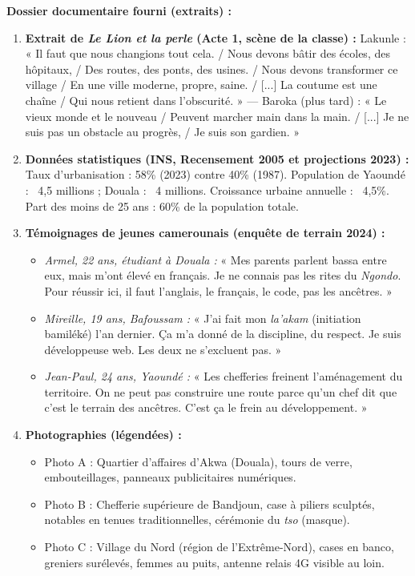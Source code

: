 \documentclass[11pt]{article}
\begin{document}
\medskip
\textbf{Dossier documentaire fourni (extraits) :}

\begin{enumerate}
    \item \textbf{Extrait de \emph{Le Lion et la perle} (Acte 1, scène de la classe) :} Lakunle : « Il faut que nous changions tout cela. / Nous devons bâtir des écoles, des hôpitaux, / Des routes, des ponts, des usines. / Nous devons transformer ce village / En une ville moderne, propre, saine. / [...] La coutume est une chaîne / Qui nous retient dans l'obscurité. » — Baroka (plus tard) : « Le vieux monde et le nouveau / Peuvent marcher main dans la main. / [...] Je ne suis pas un obstacle au progrès, / Je suis son gardien. »
    \item \textbf{Données statistiques (INS, Recensement 2005 et projections 2023) :} Taux d'urbanisation : 58\% (2023) contre 40\% (1987). Population de Yaoundé : ~4,5 millions ; Douala : ~4 millions. Croissance urbaine annuelle : ~4,5\%. Part des moins de 25 ans : 60\% de la population totale.
    \item \textbf{Témoignages de jeunes camerounais (enquête de terrain 2024) :}
    \begin{itemize}
        \item \textit{Armel, 22 ans, étudiant à Douala :} « Mes parents parlent bassa entre eux, mais m'ont élevé en français. Je ne connais pas les rites du \emph{Ngondo}. Pour réussir ici, il faut l'anglais, le français, le code, pas les ancêtres. »
        \item \textit{Mireille, 19 ans, Bafoussam :} « J'ai fait mon \emph{la'akam} (initiation bamiléké) l'an dernier. Ça m'a donné de la discipline, du respect. Je suis développeuse web. Les deux ne s'excluent pas. »
        \item \textit{Jean-Paul, 24 ans, Yaoundé :} « Les chefferies freinent l'aménagement du territoire. On ne peut pas construire une route parce qu'un chef dit que c'est le terrain des ancêtres. C'est ça le frein au développement. »
    \end{itemize}
    \item \textbf{Photographies (légendées) :}
    \begin{itemize}
        \item Photo A : Quartier d'affaires d'Akwa (Douala), tours de verre, embouteillages, panneaux publicitaires numériques.
        \item Photo B : Chefferie supérieure de Bandjoun, case à piliers sculptés, notables en tenues traditionnelles, cérémonie du \emph{tso} (masque).
        \item Photo C : Village du Nord (région de l'Extrême-Nord), cases en banco, greniers surélevés, femmes au puits, antenne relais 4G visible au loin.
    \end{itemize}
\end{enumerate}
\end{document}
